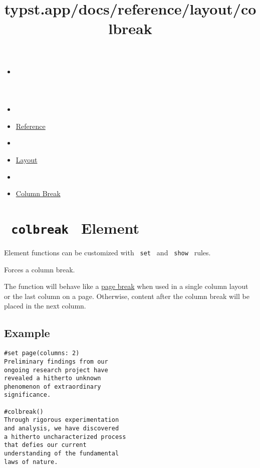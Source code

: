\title{typst.app/docs/reference/layout/colbreak}

\begin{itemize}
\tightlist
\item
  \href{/docs}{}
\item
  
\item
  \href{/docs/reference/}{Reference}
\item
  
\item
  \href{/docs/reference/layout/}{Layout}
\item
  
\item
  \href{/docs/reference/layout/colbreak/}{Column Break}
\end{itemize}

\section{\texorpdfstring{\texttt{\ colbreak\ } {{ Element
}}}{ colbreak   Element }}\label{summary}

\label{element-tooltip}
Element functions can be customized with \texttt{\ set\ } and
\texttt{\ show\ } rules.

Forces a column break.

The function will behave like a
\href{/docs/reference/layout/pagebreak/}{page break} when used in a
single column layout or the last column on a page. Otherwise, content
after the column break will be placed in the next column.

\subsection{Example}\label{example}

\begin{verbatim}
#set page(columns: 2)
Preliminary findings from our
ongoing research project have
revealed a hitherto unknown
phenomenon of extraordinary
significance.

#colbreak()
Through rigorous experimentation
and analysis, we have discovered
a hitherto uncharacterized process
that defies our current
understanding of the fundamental
laws of nature.
\end{verbatim}

